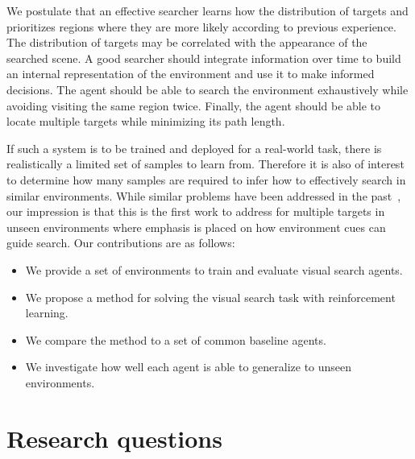 We postulate that an effective searcher learns how the distribution of targets and prioritizes regions where they are more likely according to previous experience.
The distribution of targets may be correlated with the appearance of the searched scene.
A good searcher should integrate information over time to build an internal representation of the environment and use it to make informed decisions.
The agent should be able to search the environment exhaustively while avoiding visiting the same region twice.
Finally, the agent should be able to locate multiple targets while minimizing its path length.

If such a system is to be trained and deployed for a real-world task, there is realistically a limited set of samples to learn from.
Therefore it is also of interest to determine how many samples are required to infer how to effectively search in similar environments.
While similar problems have been addressed in the past~\cite{minut_mahadevan_2001,mirowski_navigate_2017}, 
our impression is that this is the first work to address for multiple targets in unseen environments where emphasis is placed on how environment cues can guide search.
Our contributions are as follows:

\begin{itemize}
  \item We provide a set of environments to train and evaluate visual search agents.
  \item We propose a method for solving the visual search task with reinforcement learning.
  \item We compare the method to a set of common baseline agents.
  \item We investigate how well each agent is able to generalize to unseen environments.
\end{itemize}

\section{Research questions}
\label{sec:research-questions}

